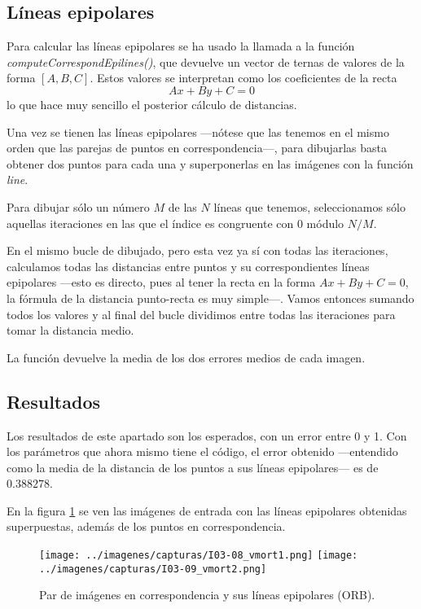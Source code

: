 \documentclass[a4paper, 11pt]{article}
\theoremstyle{definition}
\theoremstyle{theorem}
\begin{document}
    \subsection{Líneas epipolares}
    Para calcular las líneas epipolares se ha usado la llamada a la función \emph{computeCorrespondEpilines()}, que devuelve un vector de ternas de valores de la forma $[A,B,C]$. Estos valores se interpretan como los coeficientes de la recta
    \[
    Ax + By + C = 0
    \]
    lo que hace muy sencillo el posterior cálculo de distancias.

    Una vez se tienen las líneas epipolares ---nótese que las tenemos en el mismo orden que las parejas de puntos en correspondencia---, para dibujarlas basta obtener dos puntos para cada una y superponerlas en las imágenes con la función \emph{line}.

    Para dibujar sólo un número $M$ de las $N$ líneas que tenemos, seleccionamos sólo aquellas iteraciones en las que el índice es congruente con 0 módulo $N/M$.

    En el mismo bucle de dibujado, pero esta vez ya sí con todas las iteraciones, calculamos todas las distancias entre puntos y su correspondientes líneas epipolares ---esto es directo, pues al tener la recta en la forma $Ax+By+C = 0$, la fórmula de la distancia punto-recta es muy simple---. Vamos entonces sumando todos los valores y al final del bucle dividimos entre todas las iteraciones para tomar la distancia medio.

    La función devuelve la media de los dos errores medios de cada imagen.

    \subsection{Resultados}
    Los resultados de este apartado son los esperados, con un error entre 0 y 1. Con los parámetros que ahora mismo tiene el código, el error obtenido ---entendido como la media de la distancia de los puntos a sus líneas epipolares--- es de $0.388278$.

    En la figura \ref{fig:vmort} se ven las imágenes de entrada con las líneas epipolares obtenidas superpuestas, además de los puntos en correspondencia.

    \begin{figure}[!htb]
        \texttt{[image: ../imagenes/capturas/I03-08\_vmort1.png]}
        \endminipage\hfill
        \texttt{[image: ../imagenes/capturas/I03-09\_vmort2.png]}
        \endminipage
        \caption{Par de imágenes en correspondencia y sus líneas epipolares (ORB).}\label{fig:vmort}
    \end{figure}
\end{document}
